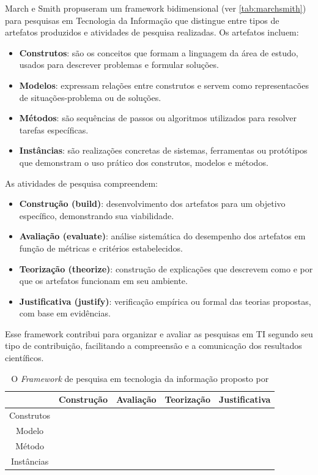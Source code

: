 March e Smith \cite{march1995design} propuseram um framework bidimensional (ver \autoref{tab:marchsmith}) para pesquisas em Tecnologia da Informação que distingue entre tipos de artefatos produzidos e atividades de pesquisa realizadas. Os artefatos incluem:
\begin{itemize}
    \item \textbf{Construtos}: são os conceitos que formam a linguagem da área de estudo, usados para descrever problemas e formular soluções.
    \item \textbf{Modelos}: expressam relações entre construtos e servem como representacões de situações-problema ou de soluções.
    \item \textbf{Métodos}: são sequências de passos ou algoritmos utilizados para resolver tarefas específicas.
    \item \textbf{Instâncias}: são realizações concretas de sistemas, ferramentas ou protótipos que demonstram o uso prático dos construtos, modelos e métodos.
\end{itemize}

As atividades de pesquisa compreendem:
\begin{itemize}
    \item \textbf{Construção (build)}: desenvolvimento dos artefatos para um objetivo específico, demonstrando sua viabilidade.
    \item \textbf{Avaliação (evaluate)}: análise sistemática do desempenho dos artefatos em função de métricas e critérios estabelecidos.
    \item \textbf{Teorização (theorize)}: construção de explicações que descrevem como e por que os artefatos funcionam em seu ambiente.
    \item \textbf{Justificativa (justify)}: verificação empírica ou formal das teorias propostas, com base em evidências.
\end{itemize}

Esse framework contribui para organizar e avaliar as pesquisas em TI segundo seu tipo de contribuição, facilitando a compreensão e a comunicação dos resultados científicos.

\begin{table}[hbt]
    \centering
    \begin{tabular}{|c|c|c|c|c|}
    \hline
       & Construção & Avaliação & Teorização & Justificativa  \\    \hline
    Construtos &&&&\\     \hline
    Modelo &&&&\\    \hline
    Método &&&&\\    \hline
    Instâncias &&&&\\    \hline
    \end{tabular}
    \caption{O \textit{Framework} de pesquisa em tecnologia da informação proposto por \citet{march1995design}}
    \label{tab:marchsmith}
\end{table}

